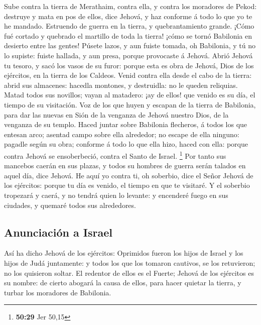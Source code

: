  Sube contra la tierra de Merathaim, contra ella, y
contra los moradores de Pekod: destruye y mata en pos de ellos, dice
Jehová, y haz conforme á todo lo que yo te he mandado. 
Estruendo de guerra en la tierra, y quebrantamiento grande.
 ¡Cómo fué cortado y quebrado el martillo de toda la
tierra! ¡cómo se tornó Babilonia en desierto entre las gentes!
 Púsete lazos, y aun fuiste tomada, oh Babilonia, y tú no
lo supiste: fuiste hallada, y aun presa, porque provocaste á Jehová.
 Abrió Jehová tu tesoro, y sacó los vasos de su furor:
porque esta es obra de Jehová, Dios de los ejércitos, en la tierra de
los Caldeos.  Venid contra ella desde el cabo de la
tierra: abrid sus almacenes: hacedla montones, y destruidla: no le
queden reliquias.  Matad todos sus novillos; vayan al
matadero: ¡ay de ellos! que venido es su día, el tiempo de su
visitación.  Voz de los que huyen y escapan de la tierra
de Babilonia, para dar las nuevas en Sión de la venganza de Jehová
nuestro Dios, de la venganza de su templo.  Haced juntar
sobre Babilonia flecheros, á todos los que entesan arco; asentad campo
sobre ella alrededor; no escape de ella ninguno: pagadle según su obra;
conforme á todo lo que ella hizo, haced con ella: porque contra Jehová
se ensoberbeció, contra el Santo de Israel. \footnote{\textbf{50:29} Jer
  50,15}  Por tanto sus mancebos caerán en sus plazas, y
todos su hombres de guerra serán talados en aquel día, dice Jehová.
 He aquí yo contra ti, oh soberbio, dice el Señor Jehová
de los ejércitos: porque tu día es venido, el tiempo en que te visitaré.
 Y el soberbio tropezará y caerá, y no tendrá quien lo
levante: y encenderé fuego en sus ciudades, y quemaré todos sus
alrededores.

\hypertarget{anunciaciuxf3n-a-israel}{%
\subsection{Anunciación a Israel}\label{anunciaciuxf3n-a-israel}}

 Así ha dicho Jehová de los ejércitos: Oprimidos fueron
los hijos de Israel y los hijos de Judá juntamente: y todos los que los
tomaron cautivos, se los retuvieron; no los quisieron soltar.
 El redentor de ellos es el Fuerte; Jehová de los
ejércitos es su nombre: de cierto abogará la causa de ellos, para hacer
quietar la tierra, y turbar los moradores de Babilonia.

